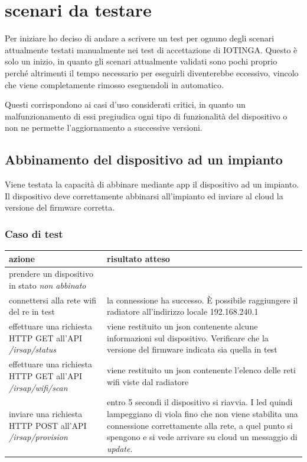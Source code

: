 \documentclass[12pt,a4paper,twoside,titlepage]{book}
\begin{document}
\section{scenari da testare}

Per iniziare ho deciso di andare a scrivere un test per ognuno degli scenari attualmente
testati manualmente nei test di accettazione di IOTINGA. Questo è solo un inizio, in quanto 
gli scenari attualmente validati sono pochi proprio perché altrimenti il tempo necessario per 
eseguirli diventerebbe eccessivo, vincolo che viene completamente rimosso eseguendoli in automatico.

Questi corrispondono ai casi d'uso considerati critici, in quanto un malfunzionamento
di essi pregiudica ogni tipo di funzionalità del dispositivo o non ne permette l'aggiornamento
a successive versioni.

\subsection{Abbinamento del dispositivo ad un impianto}
\label{section:test_pairing}

Viene testata la capacità di abbinare mediante app il dispositivo ad un impianto.
Il dispositivo deve correttamente abbinarsi all’impianto ed inviare al cloud la versione
del \gls{firmware} corretta.

\subsubsection{Caso di test}
\begin{center}
\begin{tabular}{| p{} | p{} |}
    \hline 
    \textbf{azione} & \textbf{risultato atteso} \\ \hline
    prendere un dispositivo in stato \textit{non abbinato} & \\ \hline
    connettersi alla rete \Gls{wifi} del \Gls{re} in test & la connessione ha successo. È possibile raggiungere il radiatore all'indirizzo locale 192.168.240.1 \\ \hline
    effettuare una richiesta HTTP GET all'API \textit{/irsap/status} & viene restituito un \acrshort{json} contenente alcune informazioni sul dispositivo. Verificare che la versione del \gls{firmware} indicata sia quella in test \\ \hline
    effettuare una richiesta HTTP GET all'API \textit{/irsap/wifi/scan} & viene restituito un \acrshort{json} contenente l'elenco delle reti \Gls{wifi} viste dal radiatore \\ \hline
    inviare una richiesta HTTP POST all'API \textit{/irsap/provision} & entro 5 secondi il dispositivo si riavvia. I led quindi lampeggiano di viola fino che non viene stabilita una connessione correttamente alla rete, a quel punto si spengono e si vede arrivare su cloud un messaggio di \textit{update}. \\ \hline
\end{tabular}
\end{center}
\end{document}
